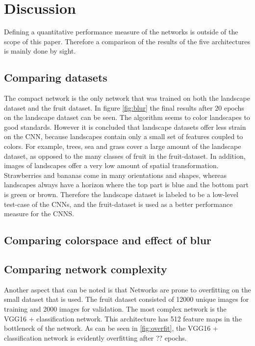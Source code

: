 \section{Discussion}

Defining a quantitative performance measure of the networks is outside of the scope of this paper. Therefore a comparison of the results of the five architectures is mainly done by sight.

\subsection{Comparing datasets}
The compact network is the only network that was trained on both the landscape dataset and the fruit dataset. In figure \ref{fig:blur} the final results after 20 epochs on the landscape dataset can be seen. The algorithm seems to color landscapes to good standards. However it is concluded that landscape datasets offer less strain on the CNN, because landscapes contain only a small set of features coupled to colors. For example, trees, sea and grass cover a large amount of the landscape dataset, as opposed to the many classes of fruit in the fruit-dataset. In addition, images of landscapes offer a very low amount of spatial transformation. Strawberries and bananas come in many orientations and shapes, whereas landscapes always have a horizon where the top part is blue and the bottom part is green or brown. Therefore the landscape dataset is labeled to be a low-level test-case of the CNNs, and the fruit-dataset is used as a better performance measure for the CNNS.

\subsection{Comparing colorspace and effect of blur}

\subsection{Comparing network complexity}
Another aspect that can be noted is that Networks are prone to overfitting on the small dataset that is used. The fruit dataset consisted of 12000 unique images for training and 2000 images for validation. The most complex network is the VGG16 + classification network. This architecture has 512 feature maps in the bottleneck of the network. As can be seen in \ref{fig:overfit}, the VGG16 + classification network is evidently overfitting after ?? epochs. 

